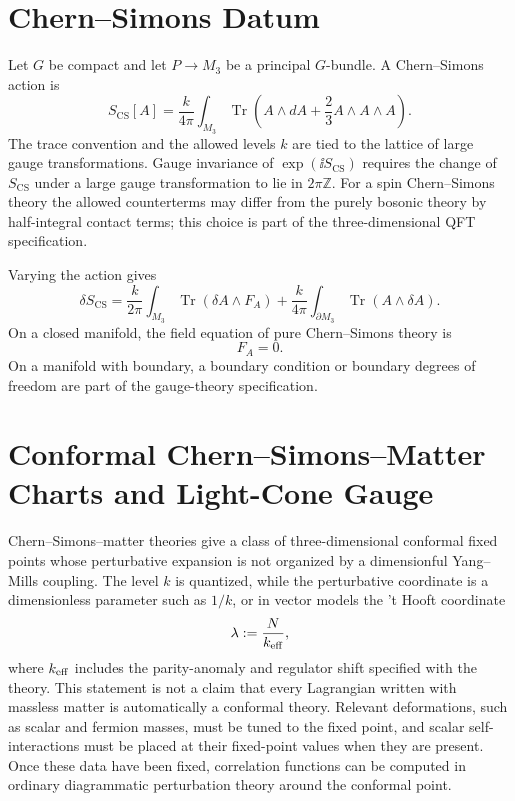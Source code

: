 \section{Chern--Simons Datum}

Let \(G\) be compact and let \(P\to M_3\) be a principal \(G\)-bundle.  A
Chern--Simons action is
\[
  S_{\mathrm{CS}}[A]
  =
  \frac{k}{4\pi}
  \int_{M_3}\operatorname{Tr}
  \left(A\wedge dA+\frac23A\wedge A\wedge A\right).
\]
The trace convention and the allowed levels \(k\) are tied to the lattice of
large gauge transformations.  Gauge invariance of
\(\exp(\ii S_{\mathrm{CS}})\) requires the change of \(S_{\mathrm{CS}}\) under
a large gauge transformation to lie in \(2\pi\mathbb Z\).  For a spin
Chern--Simons theory the allowed counterterms may differ from the purely
bosonic theory by half-integral contact terms; this choice is part of the
three-dimensional QFT specification.

Varying the action gives
\[
  \delta S_{\mathrm{CS}}
  =
  \frac{k}{2\pi}\int_{M_3}\operatorname{Tr}(\delta A\wedge F_A)
  +
  \frac{k}{4\pi}\int_{\partial M_3}\operatorname{Tr}(A\wedge\delta A).
\]
On a closed manifold, the field equation of pure Chern--Simons theory is
\[
  F_A=0.
\]
On a manifold with boundary, a boundary condition or boundary degrees of
freedom are part of the gauge-theory specification.

\section{Conformal Chern--Simons--Matter Charts and Light-Cone Gauge}
\label{sec:cs-matter-light-cone-vector-models}

Chern--Simons--matter theories give a class of three-dimensional conformal
fixed points whose perturbative expansion is not organized by a dimensionful
Yang--Mills coupling.  The level \(k\) is quantized, while the perturbative
coordinate is a dimensionless parameter such as \(1/k\), or in vector models
the 't Hooft coordinate
\begin{equation}
  \lambda:=\frac{N}{k_{\rm eff}},
  \label{eq:cs-vector-thooft-coordinate}
\end{equation}
where \(k_{\rm eff}\) includes the parity-anomaly and regulator shift specified
with the theory.  This statement is not a claim that every Lagrangian written
with massless matter is automatically a conformal theory.  Relevant
deformations, such as scalar and fermion masses, must be tuned to the fixed
point, and scalar self-interactions must be placed at their fixed-point values
when they are present.  Once these data have been fixed, correlation functions
can be computed in ordinary diagrammatic perturbation theory around the
conformal point.

